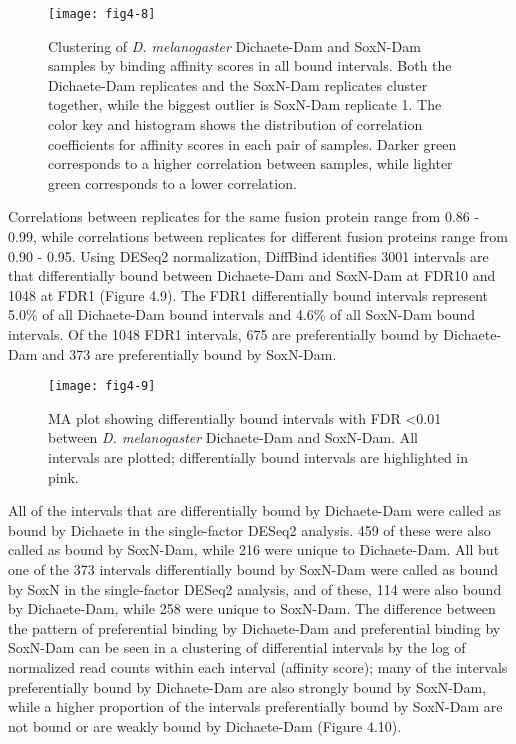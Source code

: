 \begin{figure}[H]
\centering
\texttt{[image: fig4-8]}
\caption[Clustering of \emph{D. melanogaster} Dichaete-Dam and SoxN-Dam samples by binding affinity scores in all bound intervals]{Clustering of \emph{D. melanogaster} Dichaete-Dam and SoxN-Dam samples by binding affinity scores in all bound intervals. Both the Dichaete-Dam replicates and the SoxN-Dam replicates cluster together, while the biggest outlier is SoxN-Dam replicate 1. The color key and histogram shows the distribution of correlation coefficients for affinity scores in each pair of samples. Darker green corresponds to a higher correlation between samples, while lighter green corresponds to a lower correlation.}
\label{Figure 4.8}
\end{figure}

Correlations between replicates for the same fusion protein range from 0.86 - 0.99, while correlations between replicates for different fusion proteins range from 0.90 - 0.95. Using DESeq2 normalization, DiffBind identifies 3001 intervals are that differentially bound between Dichaete-Dam and SoxN-Dam at FDR10 and 1048 at FDR1 (Figure 4.9). The FDR1 differentially bound intervals represent 5.0\% of all Dichaete-Dam bound intervals and 4.6\% of all SoxN-Dam bound intervals. Of the 1048 FDR1 intervals, 675 are preferentially bound by Dichaete-Dam and 373 are preferentially bound by SoxN-Dam.

\begin{figure}
\centering
\texttt{[image: fig4-9]}
\caption[Differentially bound intervals with FDR \textless 0.01 between \emph{D. melanogaster} Dichaete-Dam and SoxN-Dam]{MA plot showing differentially bound intervals with FDR \textless 0.01 between \emph{D. melanogaster} Dichaete-Dam and SoxN-Dam. All intervals are plotted; differentially bound intervals are highlighted in pink.} 
\label{Figure 4.9}
\end{figure}

All of the intervals that are differentially bound by Dichaete-Dam were called as bound by Dichaete in the single-factor DESeq2 analysis. 459 of these were also called as bound by SoxN-Dam, while 216 were unique to Dichaete-Dam. All but one of the 373 intervals differentially bound by SoxN-Dam were called as bound by SoxN in the single-factor DESeq2 analysis, and of these, 114 were also bound by Dichaete-Dam, while 258 were unique to SoxN-Dam. The difference between the pattern of preferential binding by Dichaete-Dam and preferential binding by SoxN-Dam can be seen in a clustering of differential intervals by the log of normalized read counts within each interval (affinity score); many of the intervals preferentially bound by Dichaete-Dam are also strongly bound by SoxN-Dam, while a higher proportion of the intervals preferentially bound by SoxN-Dam are not bound or are weakly bound by Dichaete-Dam (Figure 4.10).

